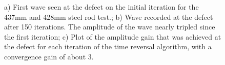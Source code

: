 \documentclass[11pt,letterpaper]{article}%
\begin{document}
 \begin{figure}
\begin{subfigmatrix}{3}
\end{subfigmatrix}

   \caption[all]
   { \label{steelExp3}
   a) First wave seen at the defect on the initial iteration for the 437mm and 428mm steel rod test.; b) Wave recorded at the defect after 150 iterations. The amplitude of the wave nearly tripled since the first iteration; c) Plot of the amplitude gain that was achieved at the defect for each iteration of the time reversal algorithm, with a convergence gain of about 3.
 }
\end{figure}
\end{document}
